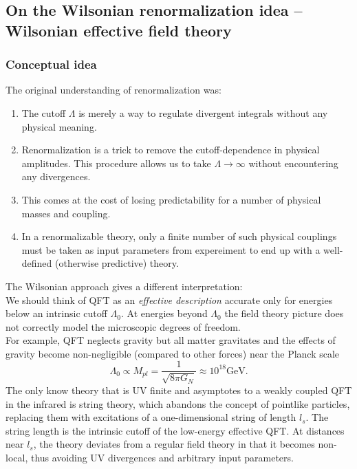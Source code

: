 \subsection{On the Wilsonian renormalization idea -- Wilsonian effective field theory}
\subsubsection{Conceptual idea}
The original understanding of renormalization was:
\begin{enumerate}
	\item The cutoff $\Lambda$ is merely a way to regulate divergent integrals without any physical meaning.
	\item Renormalization is a trick to remove the cutoff-dependence in physical amplitudes. This procedure allows us to take $\Lambda \rightarrow \infty$ without encountering any divergences.
	\item This comes at the cost of losing predictability for a number of physical masses and coupling.
	\item In a renormalizable theory, only a finite number of such physical couplings must be taken as input parameters from expereiment to end up with a well-defined (otherwise predictive) theory.
\end{enumerate}
The Wilsonian approach gives a different interpretation:\\
We should think of QFT as an \emph{effective description} accurate only for energies below an intrinsic cutoff $\Lambda_0$. At energies beyond $\Lambda_0$ the field theory picture does not correctly model the microscopic degrees of freedom.\\
For example, QFT neglects gravity but all matter gravitates and the effects of gravity become non-negligible (compared to other forces) near the Planck scale
\begin{equation}
	\Lambda_0 \propto M_{pl} = \frac{1}{\sqrt{8  \pi G_N}} \approx 10^{18} \mathrm{GeV}.
\end{equation}
The only know theory that is UV finite and asymptotes to a weakly coupled QFT in the infrared is string theory, which abandons the concept of pointlike particles, replacing them with excitations of a one-dimensional string of length $l_s$. The string length is the intrinsic cutoff of the low-energy effective QFT. At distances near $l_s$, the theory deviates from a regular field theory in that it becomes non-local, thus avoiding UV divergences and arbitrary input parameters.\\
